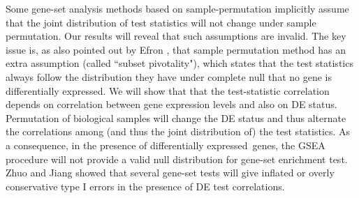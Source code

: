 \documentclass[review]{elsarticle}
\newcommand{\DED}{differentially expressed}
\begin{document}
	
	Some gene-set analysis methods based on sample-permutation implicitly
	assume that the joint distribution of test statistics will not change
	under sample permutation. Our results will reveal that such assumptions
	are invalid. The key issue is, as also pointed out by  Efron \cite{efron2012large1}, that sample 
	permutation method has an extra assumption (called ``subset pivotality"), which states that the 
	test statistics always follow the distribution they have under complete null that no gene is \DED.
	We will show that that the test-statistic correlation depends on
	correlation between gene expression levels and also on DE status.
	Permutation of biological samples will change the DE status and thus
	alternate the correlations among  (and thus the joint distribution of) the
	test statistics. As a consequence, in the presence of \DED~genes, the
	GSEA \citep{subramanian2005gene} procedure will not provide a valid null distribution for 
	gene-set enrichment test. Zhuo and Jiang \cite{zhuo2017meaca} showed that several
	gene-set tests will give inflated or overly conservative type I errors in the presence of DE test
	correlations.
	
	
	
	
	
	
	
	
\end{document}
